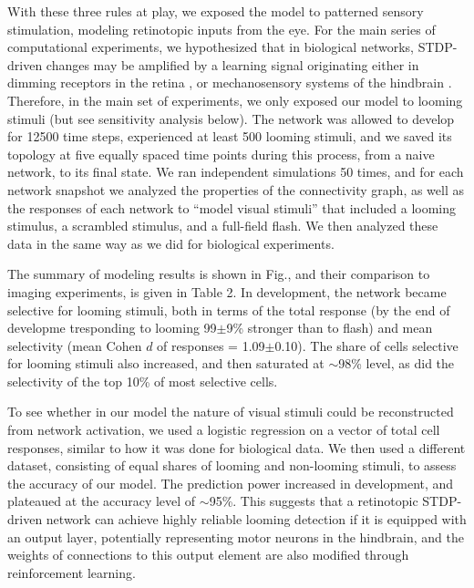 \documentclass{article}
\begin{document}
With these three rules at play, we exposed the model to patterned sensory stimulation, modeling retinotopic inputs from the eye. For the main series of computational experiments, we hypothesized that in biological networks, STDP-driven changes may be amplified by a learning signal \citep{savin2014stdpreward,aswolinskiy2015stdpreward} originating either in dimming receptors in the retina \citep{baranauskas2012}, or mechanosensory systems of the hindbrain \citep{pratt2009multisens,felch2016,truszkowski2017}. Therefore, in the main set of experiments, we only exposed our model to looming stimuli (but see sensitivity analysis below). The network was allowed to develop for 12500 time steps, experienced at least 500 looming stimuli, and we saved its topology at five equally spaced time points during this process, from a naive network, to its final state. We ran independent simulations 50 times, and for each network snapshot we analyzed the properties of the connectivity graph, as well as the responses of each network to “model visual stimuli” that included a looming stimulus, a scrambled stimulus, and a full-field flash. We then analyzed these data in the same way as we did for biological experiments.

The summary of modeling results is shown in Fig., and their comparison to imaging experiments, is given in Table 2. In development, the network became selective for looming stimuli, both in terms of the total response (by the end of developme tresponding to looming 99$\pm$9\% stronger than to flash) and mean selectivity (mean Cohen $d$ of responses = 1.09$\pm$0.10). The share of cells selective for looming stimuli also increased, and then saturated at $\sim$98\% level, as did the selectivity of the top 10\% of most selective cells.

To see whether in our model the nature of visual stimuli could be reconstructed from network activation, we used a logistic regression on a vector of total cell responses, similar to how it was done for biological data. We then used a different dataset, consisting of equal shares of looming and non-looming stimuli, to assess the accuracy of our model. The prediction power increased in development, and plateaued at the accuracy level of $\sim$95\%. This suggests that a retinotopic STDP-driven network can achieve highly reliable looming detection if it is equipped with an output layer, potentially representing motor neurons in the hindbrain, and the weights of connections to this output element are also modified through reinforcement learning.
\end{document}

